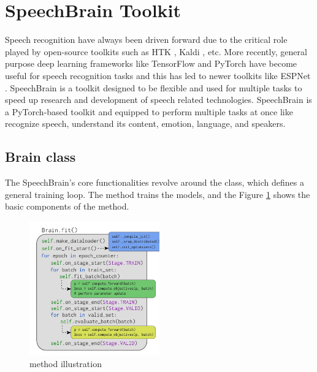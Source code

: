 \section{SpeechBrain Toolkit}
\label{section:sb}
Speech recognition have always been driven forward due to the critical role played by open-source toolkits such as HTK \cite{Young2002TheBook}, Kaldi \cite{Povey2011TheToolkit}, etc. More recently, general purpose deep learning frameworks like TensorFlow \cite{Abadi2016TensorFlow:Systems} and PyTorch \cite{Paszke2019PyTorch:Library} have become useful for speech recognition tasks and this has led to newer toolkits like ESPNet \cite{Watanabe2018ESPnet:Toolkit}. SpeechBrain \cite{Ravanelli2021SpeechBrain:Toolkit} is a toolkit designed to be flexible and used for multiple tasks to speed up research and development of speech related technologies.  SpeechBrain is a PyTorch-based toolkit and equipped to perform multiple tasks at once like recognize speech, understand its content, emotion, language, and speakers. 

\subsection{Brain class}
The SpeechBrain's core functionalities revolve around the  class, which defines a general training loop. The  method trains the models, and the Figure \ref{fig:brain} shows the basic components of the method. 

\begin{figure}[ht]
  \begin{center}
    \includegraphics[width=0.5\textwidth]{images/brainclass.png} 
    \caption{ method illustration \cite{Ravanelli2021SpeechBrain:Toolkit}}
    \label{fig:brain}
  \end{center}
\end{figure}

